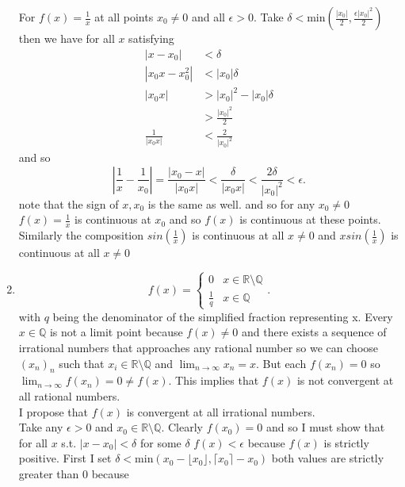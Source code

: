 \documentclass{amsart}
\begin{document}
\begin{enumerate}
            For $f(x) = \frac{1}{x}$ at all points $x_0 \ne 0$ and all $\epsilon > 0$. Take $\delta < \text{min}(\frac{|x_0|}{2}, \frac{\epsilon|x_0|^2}{2})$ then we have
            for all $x$ satisfying
            \begin{align*}
                |x-x_0| &< \delta \\
                |x_0x - x_0^2| &< |x_0|\delta \\
                |x_0x| &> |x_0|^2-|x_0|\delta \\
                       &> \frac{|x_0|^2}{2}\\
                \frac{1}{|x_0x|} &< \frac{2}{|x_0|^2}
            \end{align*}
            and so\\
            \[
            |\frac{1}{x}-\frac{1}{x_0}| = \frac{|x_0-x|}{|x_0x|} < \frac{\delta}{|x_0x|} < \frac{2\delta}{|x_0|^2} < \epsilon 
            .\] 
            note that the sign of $x,x_0$ is the same as well. and so for any $x_0 \ne 0$ $f(x)=\frac{1}{x}$ is continuous at $x_0$ and so $f(x)$ is continuous at these points.
            Similarly the composition $sin(\frac{1}{x})$ is continuous at all $x \ne 0$ and $xsin(\frac{1}{x})$ is continuous at all $x \ne 0$\\
        \item 
            \[
            f(x) =
            \begin{cases}
                0 & x \in \mathbb{R} \setminus \mathbb{Q} \\
                \frac{1}{q} & x \in \mathbb{Q} 
            \end{cases}
            .\] 
            with $q$ being the denominator of the simplified fraction representing x.
            Every $x \in \mathbb{Q} $ is not a limit point because $f(x) \ne 0$ and there exists a sequence of irrational numbers
            that approaches any rational number so we can choose $(x_n)_n$ such that $x_i \in \mathbb{R} \setminus \mathbb{Q} $ and $\lim_{n\to\infty}x_n = x$.
            But each $f(x_n) = 0$ so $\lim_{n\to\infty}f(x_n) = 0 \ne f(x)$. This implies that $f(x)$ is not convergent at all rational numbers.\\
            I propose that $f(x)$ is convergent at all irrational numbers.\\
            Take any $\epsilon > 0$ and $x_0 \in \mathbb{R} \setminus \mathbb{Q} $. Clearly $f(x_0) = 0$ and so I must show that for all $x$ s.t. $|x-x_0| < \delta $ for some $\delta $ 
            $f(x) < \epsilon $ because $f(x)$ is strictly positive. First I set $\delta < \text{min}(x_0-\lfloor x_0 \rfloor, \lceil x_0 \rceil - x_0)$ both values are strictly greater than $0$ because

\end{enumerate}
\end{document}

